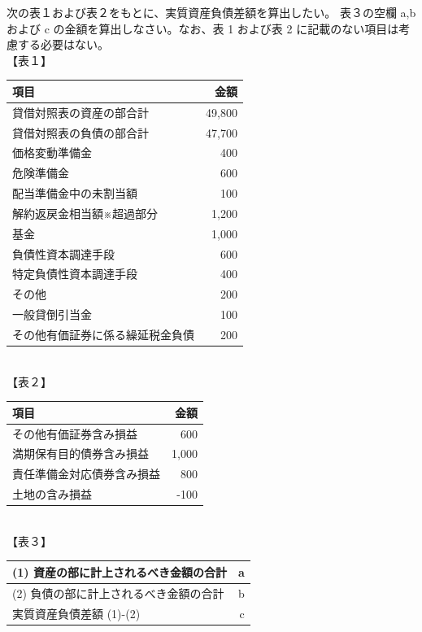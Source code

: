\documentclass[report,gutter=10mm,fore-edge=10mm,uplatex,dvipdfmx]{jlreq}
\begin{document}

次の表１および表２をもとに、実質資産負債差額を算出したい。
表３の空欄 a,b および c の金額を算出しなさい。なお、表 1 および表 2 に記載のない項目は考慮する必要はない。\\

【表１】\\
\begin{tabular}{|l|r|}
\hline 項目&金額\\ \hline \hline
貸借対照表の資産の部合計&49,800\\ \hline
貸借対照表の負債の部合計&47,700\\ \hline
価格変動準備金&400\\ \hline
危険準備金&600\\ \hline
配当準備金中の未割当額&100\\ \hline
解約返戻金相当額※超過部分&1,200\\ \hline
基金&1,000\\ \hline
負債性資本調達手段&600\\ \hline
特定負債性資本調達手段&400\\ \hline
その他&200\\ \hline
一般貸倒引当金&100\\ \hline
その他有価証券に係る繰延税金負債&200\\ \hline
\end{tabular}\\

【表２】\\
\begin{tabular}{|l|r|}
\hline
 項目&金額\\\hline\hline
その他有価証券含み損益&600\\ \hline
満期保有目的債券含み損益&1,000\\ \hline
責任準備金対応債券含み損益&800\\ \hline
土地の含み損益&-100\\ \hline
\end{tabular}\\ 

【表３】\\
\begin{tabular}{|l|r|}
\hline
 (1) 資産の部に計上されるべき金額の合計& a\\ \hline
 (2) 負債の部に計上されるべき金額の合計& b\\\hline
 実質資産負債差額 (1)-(2) & c\\\hline
\end{tabular}
\end{document}
